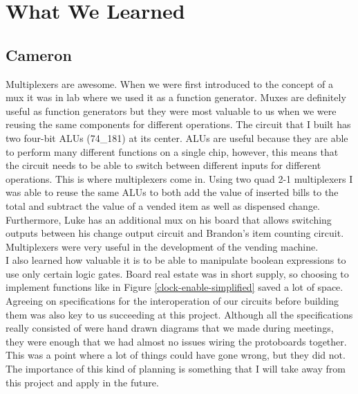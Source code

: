\section{What We Learned}

\subsection{Cameron}
Multiplexers are awesome. When we were first introduced to the concept of a mux it was in lab where we used it as a function generator. Muxes are definitely useful as function generators but they were most valuable to us when we were reusing the same components for different operations. The circuit that I built has two four-bit ALUs (74\_181) at its center. ALUs are useful because they are able to perform many different functions on a single chip, however, this means that the circuit needs to be able to switch between different inputs for different operations. This is where multiplexers come in. Using two quad 2-1 multiplexers I was able to reuse the same ALUs to both add the value of inserted bills to the total and subtract the value of a vended item as well as dispensed change. Furthermore, Luke has an additional mux on his board that allows switching outputs between his change output circuit and Brandon's item counting circuit. Multiplexers were very useful in the development of the vending machine. \\

I also learned how valuable it is to be able to manipulate boolean expressions to use only certain logic gates. Board real estate was in short supply, so choosing to implement functions like in Figure \ref{clock-enable-simplified} saved a lot of space. \\

Agreeing on specifications for the interoperation of our circuits before building them was also key to us succeeding at this project. Although all the specifications really consisted of were hand drawn diagrams that we made during meetings, they were enough that we had almost no issues wiring the protoboards together. This was a point where a lot of things could have gone wrong, but they did not. The importance of this kind of planning is something that I will take away from this project and apply in the future.

